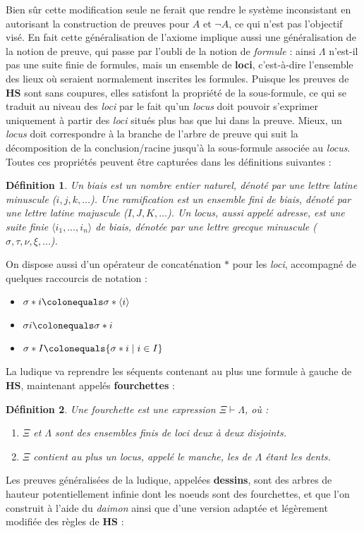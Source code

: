 \documentclass[12pt]{report}
\newcommand{\seq}{\vdash}
\newtheorem{definition}{Définition}
\begin{document}
Bien sûr cette modification seule ne ferait que rendre le système inconsistant en autorisant la construction de preuves pour $A$ et $\neg A$, ce qui n'est pas l'objectif visé. En fait cette généralisation de l'axiome implique aussi une généralisation de la notion de preuve, qui passe par l'oubli de la notion de \emph{formule} : ainsi $\Lambda$ n'est-il pas une suite finie de formules, mais un ensemble de \textbf{loci}, c'est-à-dire l'ensemble des lieux où seraient normalement inscrites les formules. Puisque les preuves de $\mathbf{HS}$ sont sans coupures, elles satisfont la propriété de la sous-formule, ce qui se traduit au niveau des \textit{loci} par le fait qu'un \textit{locus} doit pouvoir s'exprimer uniquement à partir des \textit{loci} situés plus bas que lui dans la preuve. Mieux, un \textit{locus} doit correspondre à la branche de l'arbre de preuve qui suit la décomposition de la conclusion/racine jusqu'à la sous-formule associée au \textit{locus}. Toutes ces propriétés peuvent être capturées dans les définitions suivantes :
\begin{definition}
	Un \emph{biais} est un nombre entier naturel, dénoté par une lettre latine minuscule ($i,j,k,\ldots$). Une \emph{ramification} est un ensemble fini de biais, dénoté par une lettre latine majuscule ($I,J,K,\ldots$). Un \emph{locus}, aussi appelé \emph{adresse}, est une suite finie $\langle i_1,\ldots,i_n \rangle$ de biais, dénotée par une lettre grecque minuscule ($\sigma,\tau,\nu,\xi,\ldots$).
\end{definition}
On dispose aussi d'un opérateur de concaténation $\ast$ pour les \textit{loci}, accompagné de quelques raccourcis de notation :
\begin{itemize}
	\item $\sigma \ast i \colonequals \sigma \ast \langle i \rangle$
	\item $\sigma i \colonequals \sigma \ast i$
	\item $\sigma \ast I \colonequals \{\sigma \ast i \mid i \in I \}$
\end{itemize}

La ludique va reprendre les séquents contenant au plus une formule à gauche de $\mathbf{HS}$, maintenant appelés \textbf{fourchettes} :
\begin{definition}
	Une \emph{fourchette} est une expression $\Xi \seq \Lambda$, où :
	\begin{enumerate}
		\item $\Xi$ et $\Lambda$ sont des ensembles finis de \textit{loci} deux à deux disjoints.
		\item $\Xi$ contient au plus un \textit{locus}, appelé le \emph{manche}, les  de $\Lambda$ étant les \emph{dents}.
	\end{enumerate}
\end{definition}
Les preuves généralisées de la ludique, appelées \textbf{dessins}, sont des arbres de hauteur potentiellement infinie dont les noeuds sont des fourchettes, et que l'on construit à l'aide du \textit{daimon} ainsi que d'une version adaptée et légèrement modifiée des règles de $\mathbf{HS}$ :\\
\end{document}
